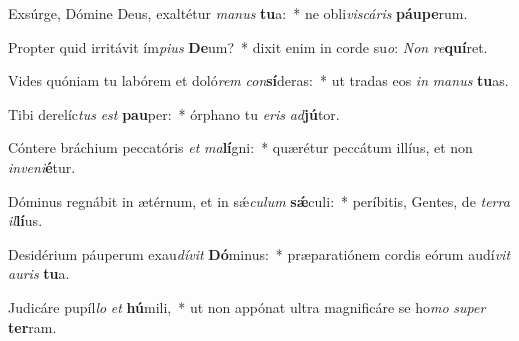 \item Exsúrge, Dómine Deus, exaltétur \textit{ma}\textit{nus} \textbf{tu}a:~* ne obli\textit{vis}\textit{cá}\textit{ris} \textbf{páu}\textbf{pe}rum.
\item Propter quid irritávit ím\textit{pi}\textit{us} \textbf{De}um?~* dixit enim in corde su\textit{o}: \textit{Non} \textit{re}\textbf{quí}ret.
\item Vides quóniam tu labórem et doló\textit{rem} \textit{con}\textbf{sí}deras:~* ut tradas eos \textit{in} \textit{ma}\textit{nus} \textbf{tu}as.
\item Tibi derelíc\textit{tus} \textit{est} \textbf{pau}per:~* órphano tu \textit{e}\textit{ris} \textit{ad}\textbf{jú}tor.
\item Cóntere bráchium peccatóris \textit{et} \textit{ma}\textbf{lí}gni:~* quærétur peccátum illíus, et non \textit{in}\textit{ve}\textit{ni}\textbf{é}tur.
\item Dóminus regnábit in ætérnum, et in sǽ\textit{cu}\textit{lum} \textbf{sǽ}culi:~* períbitis, Gentes, de \textit{ter}\textit{ra} \textit{il}\textbf{lí}us.
\item Desidérium páuperum exau\textit{dí}\textit{vit} \textbf{Dó}minus:~* præparatiónem cordis eórum audí\textit{vit} \textit{au}\textit{ris} \textbf{tu}a.
\item Judicáre pupíl\textit{lo} \textit{et} \textbf{hú}mili,~* ut non appónat ultra magnificáre se ho\textit{mo} \textit{su}\textit{per} \textbf{ter}ram.
